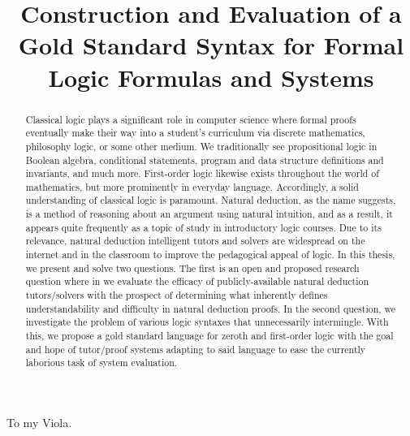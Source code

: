 \documentclass[ms]{uncgdissertationexp2}
\title{Construction and Evaluation of a Gold Standard Syntax for Formal Logic Formulas and Systems}
\theoremstyle{plain}
\theoremstyle{definition}
\theoremstyle{remark}
\begin{document}
\frontmatter      %
\doublespacing
\begin{abstract}
	Classical logic plays a significant role in computer science where formal proofs eventually make their way into a student's curriculum via discrete mathematics, philosophy logic, or some other medium. We traditionally see propositional logic in Boolean algebra, conditional statements, program and data structure definitions and invariants, and much more. First-order logic likewise exists throughout the world of mathematics, but more prominently in everyday language. Accordingly, a solid understanding of classical logic is paramount. Natural deduction, as the name suggests, is a method of reasoning about an argument using natural intuition, and as a result, it appears quite frequently as a topic of study in introductory logic courses. Due to its relevance, natural deduction intelligent tutors and solvers are widespread on the internet and in the classroom to improve the pedagogical appeal of logic. In this thesis, we present and solve two questions. The first is an open and proposed research question where in we evaluate the efficacy of publicly-available natural deduction tutors/solvers with the prospect of determining what inherently defines understandability and difficulty in natural deduction proofs. In the second question, we investigate the problem of various logic syntaxes that unnecessarily intermingle. With this, we propose a gold standard language for zeroth and first-order logic with the goal and hope of tutor/proof systems adapting to said language to ease the currently laborious task of system evaluation. 
\end{abstract}

\maketitlepage

\makecopyrightpage

\begin{dedication}
	To my Viola.
\end{dedication}

\makeapprovalpage
\end{document}
